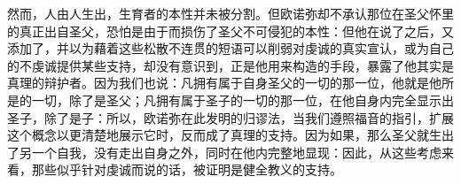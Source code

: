 然而，人由人生出，生育者的本性并未被分割。但欧诺弥却不承认那位在圣父怀里的真正出自圣父，恐怕是由于而损伤了圣父不可侵犯的本性：但他在说了之后，又添加了，并以为藉着这些松散不连贯的短语可以削弱对虔诚的真实宣认，或为自己的不虔诚提供某些支持，却没有意识到，正是他用来构造的手段，暴露了他其实是真理的辩护者。因为我们也说：凡拥有属于自身圣父的一切的那一位，他就是他所是的一切，除了是圣父；凡拥有属于圣子的一切的那一位，在他自身内完全显示出圣子，除了是子：所以，欧诺弥在此发明的归谬法，当我们遵照福音的指引，扩展这个概念以更清楚地展示它时，反而成了真理的支持。因为如果，那么圣父就生出了另一个自我，没有走出自身之外，同时在他内完整地显现：因此，从这些考虑来看，那些似乎针对虔诚而说的话，被证明是健全教义的支持。\par

